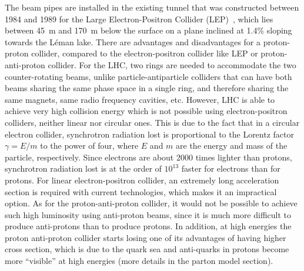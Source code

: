 The beam pipes are installed in the existing tunnel that was constructed 
between 1984 and 1989 for the Large Electron-Positron Collider (LEP)~\cite{Myers:1991ym}, 
which lies between 45~m and 170~m below the surface on a plane inclined at 1.4\% sloping 
towards the Léman lake.
There are advantages and disadvantages for a proton-proton collider,
compared to the electron-positron collider like LEP or proton-anti-proton collider.
For the LHC, two rings are needed to accommodate the two counter-rotating beams, 
unlike particle-antiparticle colliders that can have both beams sharing the same 
phase space in a single ring, and therefore sharing the same magnets, same radio 
frequency cavities, etc. However, LHC is able to achieve very high collision energy
which is not possible using electron-positron colliders, neither linear nor circular ones.
This is due to the fact that in a circular electron collider, synchrotron radiation lost is 
proportional to the Lorentz factor $\gamma = E/m$ to the power of four, where $E$ and $m$ are
the energy and mass of the particle, respectively. Since electrons are about
2000 times lighter than protons, synchrotron radiation lost is at the order of $10^{13}$
faster for electrons than for protons. For linear electron-positron collider, an extremely long
acceleration section is required with current technologies, which makes it an impractical option.
As for the proton-anti-proton collider, it would not be possible to achieve such 
high luminosity using anti-proton beams, since it is much more difficult 
to produce anti-protons than to produce protons. In addition, at high energies
the proton anti-proton collider starts losing one of its advantages of having higher cross section, 
which is due to the quark sea and anti-quarks in protons become more ``visible'' at high
energies (more details in the parton model section).

